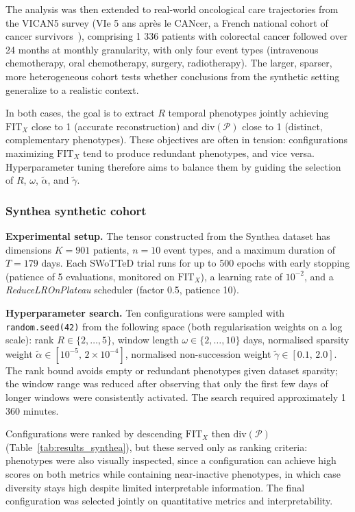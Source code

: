 \documentclass[a4paper]{cas-sc}
\begin{document}
The analysis was then extended to real-world oncological care trajectories from the VICAN5 survey (VIe 5 ans après le CANcer, a French national cohort of cancer survivors~\cite{Bouhnike005971}), comprising 1 336 patients with colorectal cancer followed over 24 months at monthly granularity, with only four event types (intravenous chemotherapy, oral chemotherapy, surgery, radiotherapy). 
The larger, sparser, more heterogeneous cohort tests whether conclusions from the synthetic setting generalize to a realistic context.
 
In both cases, the goal is to extract $R$ temporal phenotypes jointly achieving $\text{FIT}_X$ close to 1 (accurate reconstruction) and $\text{div}(\mathcal{P})$ close to 1 (distinct, complementary phenotypes). 
These objectives are often in tension: configurations maximizing $\text{FIT}_X$ tend to produce redundant phenotypes, and vice versa. 
Hyperparameter tuning therefore aims to balance them by guiding the selection of $R$, $\omega$, $\tilde{\alpha}$, and $\tilde{\gamma}$.

\subsubsection{Synthea synthetic cohort}\label{sec:synthea_res}

\textbf{Experimental setup.}
The tensor constructed from the Synthea dataset has dimensions $K = 901$ patients, $n = 10$ event types, and a maximum duration of $T = 179$ days. 
Each SWoTTeD trial runs for up to 500 epochs with early stopping (patience of 5 evaluations, monitored on $\text{FIT}_X$), a learning rate of $10^{-2}$, and a \emph{ReduceLROnPlateau} scheduler (factor 0.5, patience 10).

\textbf{Hyperparameter search.}
Ten configurations were sampled with \texttt{random.seed(42)} from the following space (both regularisation weights on a log scale): rank $R \in \{2, \ldots, 5\}$, window length $\omega \in \{2, \ldots, 10\}$ days, normalised sparsity weight $\tilde{\alpha} \in [10^{-5},\, 2 \times 10^{-4}]$, normalised non-succession weight $\tilde{\gamma} \in [0.1,\, 2.0]$. 
The rank bound avoids empty or redundant phenotypes given dataset sparsity; the window range was reduced after observing that only the first few days of longer windows were consistently activated. 
The search required approximately 1 360 minutes.
 
Configurations were ranked by descending $\text{FIT}_X$ then $\text{div}(\mathcal{P})$ (Table~\ref{tab:results_synthea}), but these served only as ranking criteria: phenotypes were also visually inspected, since a configuration can achieve high scores on both metrics while containing near-inactive phenotypes, in which case diversity stays high despite limited interpretable information. 
The final configuration was selected jointly on quantitative metrics and interpretability.
\end{document}

